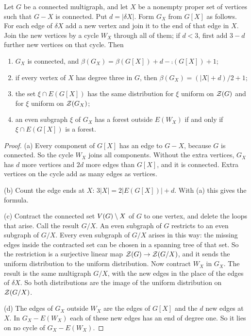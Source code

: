 \begin{lemma}[Localisation]\label{lem:loc}
Let $G$ be a connected multigraph, and let $X$ be a nonempty proper set of vertices such that
$G-X$ is connected. Put $d=|\delta X|$. Form $G_X$ from $G[X]$ as follows. For each edge of
$\delta X$ add a new vertex and join it to the end of that edge in $X$. Join the new vertices by a
cycle $W_X$ through all of them; if $d<3$, first add $3-d$ further new vertices on that cycle. Then
\begin{enumerate}
\item[\textup{(a)}] $G_X$ is connected, and $\beta(G_X)=\beta(G[X])+d-\comp(G[X])+1$;
\item[\textup{(b)}] if every vertex of $X$ has degree three in $G$, then
$\beta(G_X)=(|X|+d)/2+1$;
\item[\textup{(c)}] the set $\xi\cap E(G[X])$ has the same distribution for $\xi$ uniform on
$\mathcal{Z}(G)$ and for $\xi$ uniform on $\mathcal{Z}(G_X)$;
\item[\textup{(d)}] an even subgraph $\xi$ of $G_X$ has a forest outside $E(W_X)$ if and only if
$\xi\cap E(G[X])$ is a forest.
\end{enumerate}
\end{lemma}

\begin{proof}
(a) Every component of $G[X]$ has an edge to $G-X$, because $G$ is connected. So the cycle $W_X$
joins all components. Without the extra vertices, $G_X$ has $d$ more vertices and $2d$ more edges
than $G[X]$, and it is connected. Extra vertices on the cycle add as many edges as vertices.

(b) Count the edge ends at $X$: $3|X|=2|E(G[X])|+d$. With (a) this gives the formula.

(c) Contract the connected set $V(G)\setminus X$ of $G$ to one vertex, and delete the loops that arise.
Call the result $G/X$. An even subgraph of $G$ restricts to an even subgraph of $G/X$. Every even
subgraph of $G/X$ arises in this way: the missing edges inside the contracted set can be chosen in
a spanning tree of that set. So the restriction is a surjective linear map $\mathcal{Z}(G)\to\mathcal{Z}(G/X)$, and it
sends the uniform distribution to the uniform distribution. Now contract $W_X$ in $G_X$. The result
is the same multigraph $G/X$, with the new edges in the place of the edges of $\delta X$. So both
distributions are the image of the uniform distribution on $\mathcal{Z}(G/X)$.

(d) The edges of $G_X$ outside $W_X$ are the edges of $G[X]$ and the $d$ new edges at $X$. In
$G_X-E(W_X)$ each of these new edges has an end of degree one. So it lies on no cycle of
$G_X-E(W_X)$.
\end{proof}

